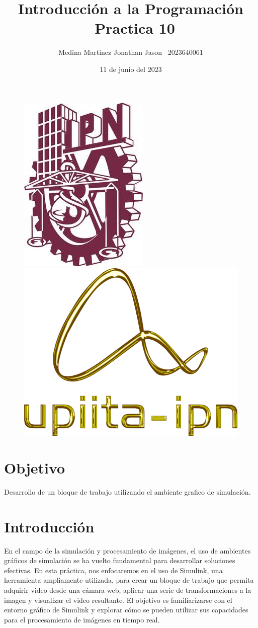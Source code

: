 \documentclass{article}
\title{Introducción a la Programación \ Practica 10}
\author{Medina Martinez Jonathan Jason \ 2023640061}
\date{11 de junio del 2023}
\begin{document}
	
	\fontsize{12}{16}\selectfont
	
	\begin{figure}[t]
		
		\includegraphics[width=2.5 cm]{Logo1.jpeg}
		\hfill
		\includegraphics[width=3 cm]{Logo2.png}
		
	\end{figure}
	
	\maketitle
	\newpage
	
	\tableofcontents
	\newpage
	
	\section{Objetivo}
	
	Desarrollo de un bloque de trabajo utilizando el ambiente grafico de simulación.
	
	\section{Introducción}
	
	En el campo de la simulación y procesamiento de imágenes, el uso de ambientes gráficos de simulación se ha vuelto fundamental para desarrollar soluciones efectivas. En esta práctica, nos enfocaremos en el uso de Simulink, una herramienta ampliamente utilizada, para crear un bloque de trabajo que permita adquirir video desde una cámara web, aplicar una serie de transformaciones a la imagen y visualizar el video resultante. El objetivo es familiarizarse con el entorno gráfico de Simulink y explorar cómo se pueden utilizar sus capacidades para el procesamiento de imágenes en tiempo real.
	
	\newpage
	
\end{document}
